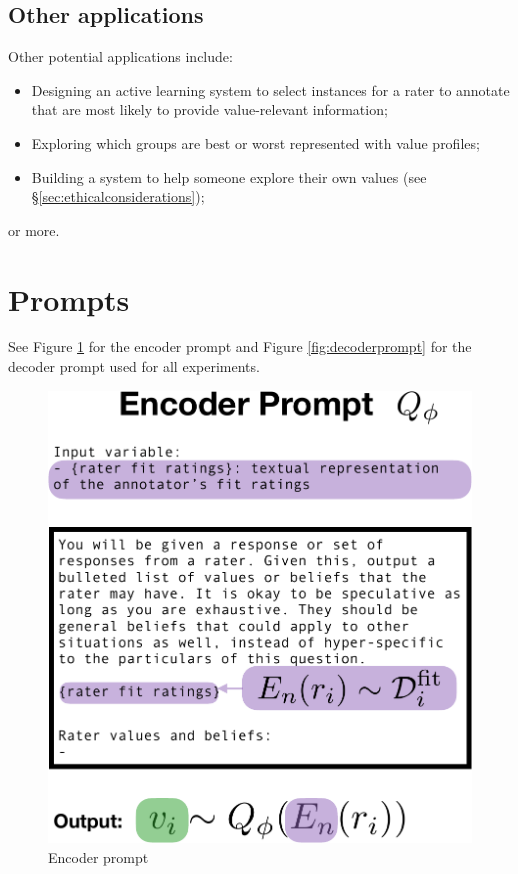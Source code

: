 \documentclass[11pt]{article}
\begin{document}
\subsection{Other applications}

Other potential applications include:
\begin{itemize}
\item Designing an active learning system to select instances for a rater to annotate that are most likely to provide value-relevant information;
\item Exploring which groups are best or worst represented with value profiles;
\item Building a system to help someone explore their own values (see \S\ref{sec:ethicalconsiderations});
\end{itemize}
or more.

\section{Prompts}
\label{app:prompts}

See Figure \ref{fig:encoderprompt} for the encoder prompt and Figure \ref{fig:decoderprompt} for the decoder prompt used for all experiments.

\begin{figure}[t]
\centering
\includegraphics[width=\columnwidth]{files/encoder_prompt_cropped.pdf}
\caption{Encoder prompt}
\label{fig:encoderprompt}
\end{figure}
\end{document}
